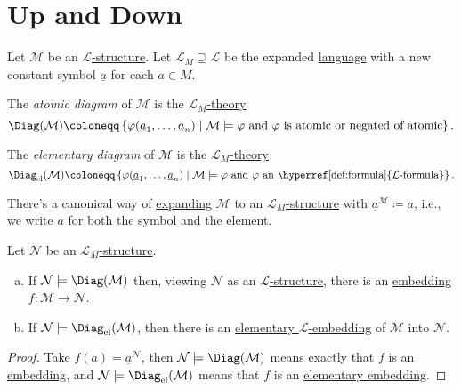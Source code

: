 \section{Up and Down}
\begin{definition*}
	Let \(\mathcal{M} \) be an \hyperref[def:structure]{\(\mathcal{L}\)-structure}. Let \(\mathcal{L} _M \supseteq \mathcal{L} \)  be the expanded \hyperref[def:language]{language} with a new constant symbol \(\underline{a}\) for each \(a\in M\).

	\begin{definition}\label{def:atomic-diagram}
		The \emph{atomic diagram} of \(\mathcal{M} \) is the \hyperref[def:theory]{\(\mathcal{L} _{M}\)-theory}
		\[
			\Diag(\mathcal{M} ) \coloneqq \left\{ \varphi (\underline{a}_1, \ldots , \underline{a}_n) \mid \mathcal{M} \models \varphi \text{ and \(\varphi \) is atomic or negated of atomic} \right\}.
		\]
	\end{definition}

	\begin{definition}\label{def:elementary-diagram}
		The \emph{elementary diagram} of \(\mathcal{M} \) is the \hyperref[def:theory]{\(\mathcal{L} _{M}\)-theory}
		\[
			\Diag_{\mathrm{el}}(\mathcal{M} ) \coloneqq \left\{ \varphi (\underline{a}_1, \ldots , \underline{a}_n) \mid \mathcal{M} \models \varphi \text{ and \(\varphi \) an \hyperref[def:formula]{\(\mathcal{L}\)-formula}} \right\}.
		\]
	\end{definition}
\end{definition*}

\begin{note}
	There's a canonical way of \hyperref[not:expansion]{expanding} \(\mathcal{M} \) to an \hyperref[def:structure]{\(\mathcal{L} _M\)-structure} with \(\underline{a}^{\mathcal{M}} \coloneqq a\), i.e., we write \(a\) for both the symbol and the element.
\end{note}

\begin{lemma}\label{lma:lec13}
	Let \(\mathcal{N} \) be an \hyperref[def:structure]{\(\mathcal{L} _M\)-structure}.
	\begin{enumerate}[(a)]
		\item If \(\mathcal{N} \models \Diag(\mathcal{M} )\) then, viewing \(\mathcal{N} \) as an \hyperref[def:structure]{\(\mathcal{L} \)-structure}, there is an \hyperref[def:embedding]{embedding} \(f\colon \mathcal{M} \to \mathcal{N} \).
		\item If \(\mathcal{N} \models \Diag_{\mathrm{el} }(\mathcal{M} )\), then there is an \hyperref[def:elementary-embedding]{elementary \(\mathcal{L} \)-embedding} of \(\mathcal{M} \) into \(\mathcal{N} \).
	\end{enumerate}
\end{lemma}
\begin{proof}
	Take \(f(a) = \underline{a}^{\mathcal{N} } \), then \(\mathcal{N} \models \Diag(\mathcal{M} )\) means exactly that \(f\) is an \hyperref[def:embedding]{embedding}, and \(\mathcal{N} \models \Diag_{\mathrm{el} }(\mathcal{M} )\) means that \(f\) is an \hyperref[def:elementary-embedding]{elementary embedding}.
\end{proof}

